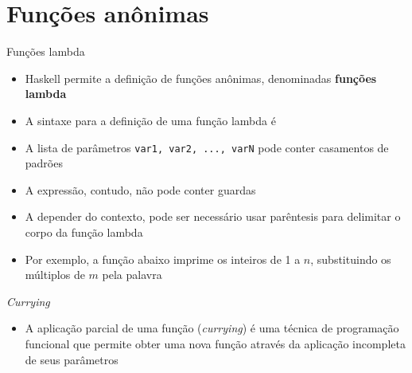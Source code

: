 \section{Funções anônimas}

\begin{frame}[fragile]{Funções lambda}

    \begin{itemize}
        \item Haskell permite a definição de funções anônimas, denominadas \textbf{funções lambda}

        \item A sintaxe para a definição de uma função lambda é


        \item A lista de parâmetros \texttt{var1, var2, ..., varN} pode conter casamentos de
            padrões

        \item A expressão, contudo, não pode conter guardas

        \item A depender do contexto, pode ser necessário usar parêntesis para delimitar o
            corpo da função lambda

        \item Por exemplo, a função abaixo imprime os inteiros de 1 a $n$, substituindo os 
            múltiplos de $m$ pela palavra 

    \end{itemize}

\end{frame}

\begin{frame}[fragile]{\it Currying}

    \begin{itemize}
        \item A aplicação parcial de uma função (\textit{currying}) é uma técnica de programação
            funcional que permite obter uma nova função através da aplicação incompleta de
            seus parâmetros
    \end{itemize}

\end{frame}
